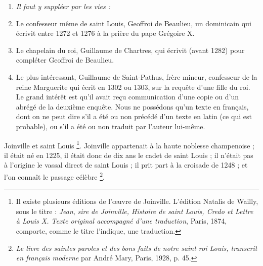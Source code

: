 \documentclass[french,twoside]{book} %
\newlength{\listmod}
\newcommand{\listhead}[1]{\hspace{-1\listmod}\emph{#1}}
\begin{document}
\begin{enumerate}[itemsep=0pt,]
\item[]\listhead{Il faut y suppléer par les vies :}
\item Le confesseur même de saint Louis, Geoffroi de Beaulieu, un dominicain qui écrivit entre 1272 et 1276 à la prière du pape Grégoire X.
\item Le chapelain du roi, Guillaume de Chartres, qui écrivit (avant 1282) pour compléter Geoffroi de Beaulieu.
\item Le plus intéressant, Guillaume de Saint-Pathus, frère mineur, confesseur de la reine Marguerite qui écrit en 1302 ou 1303, sur la requête d’une fille du roi. Le grand intérêt est qu’il avait reçu communication d’une copie ou d’un abrégé de la deuxième enquête. Nous ne possédons qu’un texte en français, dont on ne peut dire s’il a été ou non précédé d’un texte en latin (ce qui est probable), ou s’il a été ou non traduit par l’auteur lui-même.

\end{enumerate}\noindent Joinville et saint Louis \footnote{ Il existe plusieurs éditions de l’œuvre de Joinville. L’édition Natalis de Wailly, sous le titre : {\itshape Jean}, {\itshape sire de Joinville, Histoire de saint Louis, Credo et Lettre à Louis X. Texte original accompagné d’une traduction}, Paris, 1874, comporte, comme le titre l’indique, une traduction.}. Joinville appartenait à la haute noblesse champenoise ; il était né en 1225, il était donc de dix ans  
\label{p5} le cadet de saint Louis ; il n’était pas à l’origine le vassal direct de saint Louis ; il prit part à la croisade de 1248 ; et l’on connaît le passage célèbre \footnote{{\itshape Le livre des saintes paroles et des bons faits de notre saint roi Louis, transcrit en français moderne} par André Mary, Paris, 1928, p. 45.}.\par
\end{document}
